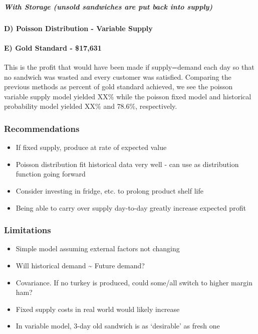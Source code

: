 \documentclass[]{article}
\begin{document}
\subparagraph{With Storage (unsold sandwiches are put back into
supply)}\label{with-storage-unsold-sandwiches-are-put-back-into-supply}

\paragraph{D) Poisson Distribution - Variable
Supply}\label{d-poisson-distribution---variable-supply}

\paragraph{E) Gold Standard - \$17,631}\label{e-gold-standard---17631}

This is the profit that would have been made if supply=demand each day
so that no sandwich was wasted and every customer was satisfied.
Comparing the previous methods as percent of gold standard achieved, we
see the poisson variable supply model yielded XX\% while the poisson
fixed model and historical probability model yielded XX\% and $78.6\%$,
respectively.

\subsubsection{Recommendations}\label{recommendations}

\begin{itemize}
\itemsep1pt\parskip0pt
\item
  If fixed supply, produce at rate of expected value
\item
  Poisson distribution fit historical data very well - can use as
  distribution function going forward
\item
  Consider investing in fridge, etc. to prolong product shelf life
\item
  Being able to carry over supply day-to-day greatly increase expected
  profit
\end{itemize}

\subsubsection{Limitations}\label{limitations}

\begin{itemize}
\itemsep1pt\parskip0pt
\item
  Simple model assuming external factors not changing
\item
  Will historical demand \textasciitilde{} Future demand?
\item
  Covariance. If no turkey is produced, could some/all switch to higher
  margin ham?
\item
  Fixed supply costs in real world would likely increase
\item
  In variable model, 3-day old sandwich is as `desirable' as fresh one
\end{itemize}
\end{document}
